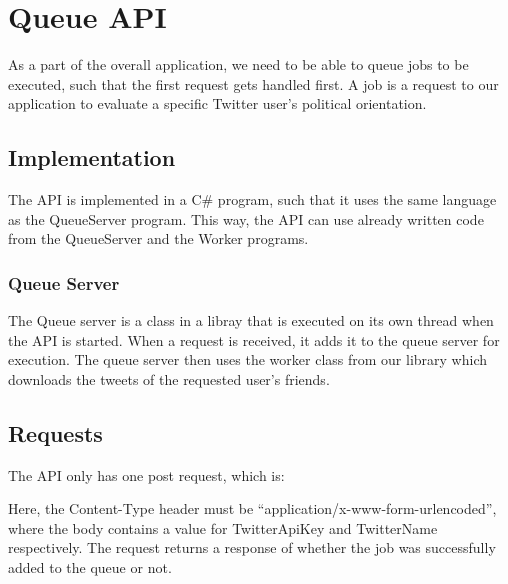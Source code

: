 \chapter{Queue \ac{API}}
As a part of the overall application, we need to be able to queue jobs to be
executed, such that the first request gets handled first. A job is a request to
our application to evaluate a specific Twitter user's political orientation.

\section{Implementation}
The \ac{API} is implemented in a C\# program, such that it uses the same
language as the QueueServer program. This way, the \ac{API} can use already
written code from the QueueServer and the Worker programs.

\subsection{Queue Server}
The Queue server is a class in a libray that is executed on its own thread when
the \ac{API} is started. When a request is received, it adds it to the queue
server for execution. The queue server then uses the worker class from our library which
downloads the tweets of the requested user's friends. 


\section{Requests}
The \ac{API} only has one post request, which is: \nl

\nl

Here, the Content-Type header must be ``application/x-www-form-urlencoded'',
where the body contains a value for TwitterApiKey and TwitterName
respectively.
The request returns a response of whether the job was successfully added to the
queue or not.



